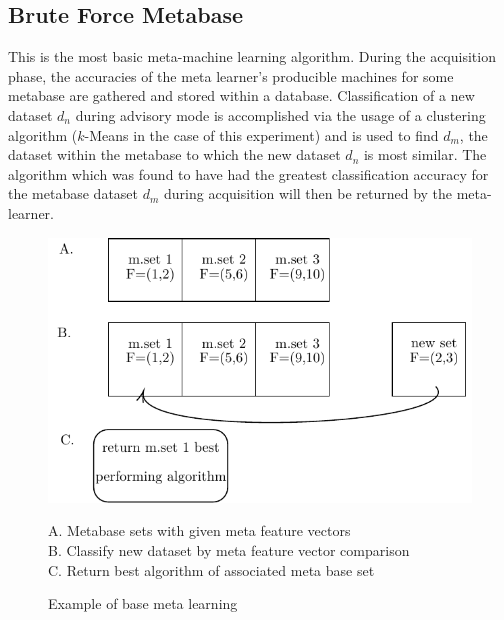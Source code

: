 \subsection{Brute Force Metabase}
This is the most basic meta-machine learning algorithm. During the acquisition phase,  the
accuracies of the meta learner's producible machines for some metabase are gathered
and stored within a database. Classification of a new dataset $d_n$ during advisory
mode is accomplished via the usage of a clustering algorithm ($k$-Means in the case
of this experiment) and is used to find $d_m$, the dataset within the metabase
to which the new dataset $d_n$ is most similar. The algorithm which was found
to have had the greatest classification accuracy for the metabase dataset $d_m$
during acquisition will then be returned by the meta-learner.
\begin{figure}[h]
\includegraphics{Chapters/Images/BaseLearner/BaseLearner.pdf}
\caption{Example of base meta learning}
\centering
\begin{flushleft}
A. Metabase sets with given meta feature vectors \\
B. Classify new dataset by meta feature vector comparison \\
C. Return best algorithm of associated meta base set
\end{flushleft}
\end{figure}

